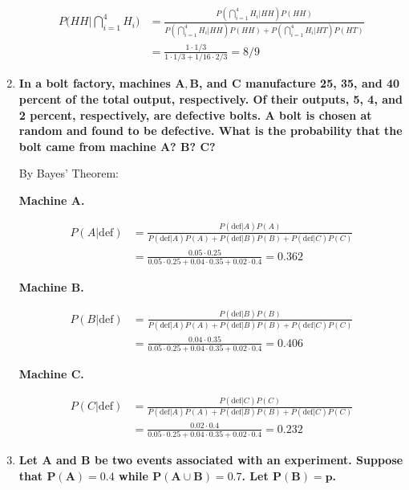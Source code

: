 \documentclass[10pt, oneside]{article}   	%
\theoremstyle{definition}
\begin{document}
\begin{enumerate}[label=3.\arabic*]
\begin{align*}
P\Bigg( HH \Bigg| \bigcap^4_{i=1} H_i \Bigg) &= \frac{ P(\bigcap^4_{i=1} H_i | HH) P(HH) }{ P(\bigcap^4_{i=1} H_i | HH) P(HH) + P(\bigcap^4_{i=1} H_i | HT) P(HT) } \\
&= \frac{1 \cdot 1/3}{1 \cdot 1/3 + 1/16 \cdot 2/3} = \boxed{8/9}
\end{align*}

\item  \begin{tcolorbox}[
  colback=Cerulean!5!white,
  colframe=Cerulean!75!black]
\textbf{In a bolt factory, machines $\bm{A, B}$, and $\bm{C}$ manufacture 25, 35, and 40 percent of the total output, respectively. Of their outputs, 5, 4, and 2 percent, respectively, are defective bolts. A bolt is chosen at random and found to be defective. What is the probability that the bolt came from machine $\bm{A}$? $\bm{B}$? $\bm{C}$?}
\end{tcolorbox}

By Bayes' Theorem:

\textbf{Machine A.}

\begin{align*}
P(A | \text{def}) &= \frac{ P(\text{def} | A) P(A) }{ P(\text{def} | A) P(A) + P(\text{def} | B) P(B) + P(\text{def} | C) P(C) } \\
&= \frac{0.05 \cdot 0.25}{ 0.05 \cdot 0.25 + 0.04 \cdot 0.35 + 0.02 \cdot 0.4 } = \boxed{0.362}
\end{align*}

\textbf{Machine B.}

\begin{align*}
P(B | \text{def}) &= \frac{ P(\text{def} | B) P(B) }{ P(\text{def} | A) P(A) + P(\text{def} | B) P(B) + P(\text{def} | C) P(C) } \\
&= \frac{0.04 \cdot 0.35}{ 0.05 \cdot 0.25 + 0.04 \cdot 0.35 + 0.02 \cdot 0.4 } = \boxed{0.406}
\end{align*}

\textbf{Machine C.}

\begin{align*}
P(C | \text{def}) &= \frac{ P(\text{def} | C) P(C) }{ P(\text{def} | A) P(A) + P(\text{def} | B) P(B) + P(\text{def} | C) P(C) } \\
&= \frac{0.02 \cdot 0.4}{ 0.05 \cdot 0.25 + 0.04 \cdot 0.35 + 0.02 \cdot 0.4 } = \boxed{0.232}
\end{align*}

\item  \begin{tcolorbox}[
  colback=Cerulean!5!white,
  colframe=Cerulean!75!black]
\textbf{Let $\bm{A}$ and $\bm{B}$ be two events associated with an experiment. Suppose that $\bm{P(A) = 0.4}$ while $\bm{P(A \cup B) = 0.7}$. Let $\bm{P(B) = p}$.}
\end{tcolorbox}


\end{enumerate}
\end{document}
